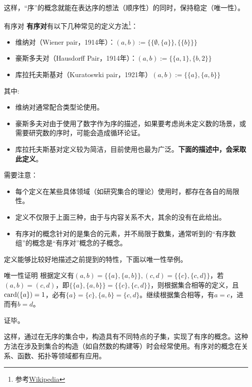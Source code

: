 这样，“序”的概念就能在表达序的想法（顺序性）的同时，保持稳定（唯一性）。

\begin{definition}{有序对}
\textbf{有序对}有以下几种常见的定义方法\footnote{参考\href{https://en.wikipedia.org/wiki/Ordered_pair}{Wikipedia}}：
\begin{itemize}
\item 维纳对（Wiener pair，1914年）：$(a, b):= \{\{\emptyset,\{ a\}\}, \{\{b\}\}\} $
\item 豪斯多夫对（Hausdorff Pair，1914年）：$ (a, b):= \{\{a, 1\}, \{b, 2\}\} $
\item 库拉托夫斯基对（Kuratoswki pair，1921年）$(a, b) := \{\{a\}, \{a, b\}\}$
\end{itemize}
\end{definition}
其中:
\begin{itemize}
\item 维纳对通常配合类型论使用。
\item 豪斯多夫对由于使用了数字作为序的描述，如果要考虑尚未定义数的场景，或需要研究数的序时，可能会造成循环论证。
\item 库拉托夫斯基对定义较为简洁，目前使用也最为广泛。\textbf{下面的描述中，会采取此定义}。
\end{itemize}

需要注意：
\begin{itemize}
\item 每个定义在某些具体领域（如研究集合的理论）使用时，都存在各自的局限性。
\item 定义不仅限于上面三种，由于与内容关系不大，其余的没有在此给出。
\item 有序对的概念针对的是集合的元素，并不局限于数集，通常听到的“有序数组”的概念是“有序对”概念的子概念。
\end{itemize}

定义能够比较好地描述之前提到的特性，下面以唯一性举例。

\begin{example}{唯一性证明}
根据定义有$(a, b) = \{\{a\}, \{a, b\}\} , (c, d) = \{\{c\}, \{c, d\}\} $，若$(a, b)=(c,d)$，即$\{\{a\}, \{a, b\}\}=\{\{c\}, \{c, d\}\}$，则根据集合相等的定义，且${\rm card}(\{a\})=1$，必有$\{a\}=\{c\},\{a, b\}=\{c, d\}$。继续根据集合相等，有$a=c$，进而有$b=d$。

证毕。
\end{example}

这样，通过在无序的集合中，构造具有不同特点的子集，实现了有序的概念。这种方法在涉及到集合的构造（如自然数的构建等）时会经常使用。有序对的概念在关系、函数、拓扑等领域都有应用。


